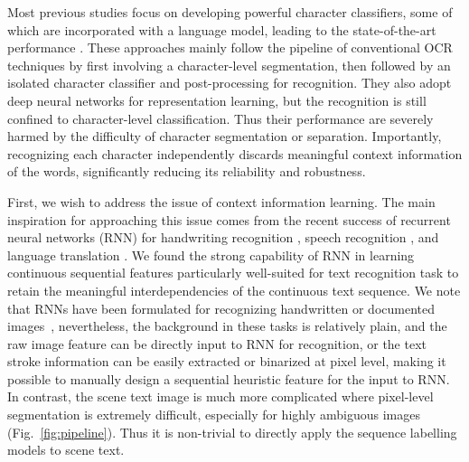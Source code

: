 \documentclass[letterpaper]{article}
\begin{document}
Most previous studies focus on developing powerful character classifiers, some of which are incorporated with a language model, leading to the state-of-the-art performance \cite{Jaderberg2014,Bissacco2013,Yao2014,Lee2014}.
%
These approaches mainly follow the pipeline of conventional OCR techniques by first involving a character-level segmentation, then followed by an isolated character classifier and post-processing for recognition.
%
They also adopt deep neural networks for representation learning, but the recognition is still confined to character-level classification.
%
%
%
Thus their performance are severely harmed by the difficulty of character segmentation or separation. Importantly, recognizing each character independently discards meaningful context information of the words, significantly reducing its reliability and robustness.

First, we wish to address the issue of context information learning.
%
The main inspiration for approaching this issue comes from the recent success of recurrent neural networks (RNN) for handwriting recognition \cite{Graves2009,Graves2008}, speech recognition \cite{Graves2014}, and language translation \cite{Sutskever2014}.
%
We found the strong capability of RNN in learning continuous sequential features particularly well-suited for text recognition task to retain the meaningful interdependencies of the continuous text sequence.
%
We note that RNNs have been formulated for recognizing handwritten or documented images~\cite{Graves2009,Graves2008,Breuel2013}, nevertheless, the background in these tasks is relatively plain, and the raw image feature can be directly input to RNN for recognition, or the text stroke information can be easily extracted or binarized at pixel level, making it possible to manually design a sequential heuristic feature for the input to RNN.
%
In contrast, the scene text image is much more complicated where pixel-level segmentation is extremely difficult, especially for highly ambiguous images (Fig.~\ref{fig:pipeline}). Thus it is non-trivial to directly apply the sequence labelling models to scene text.
\end{document}
